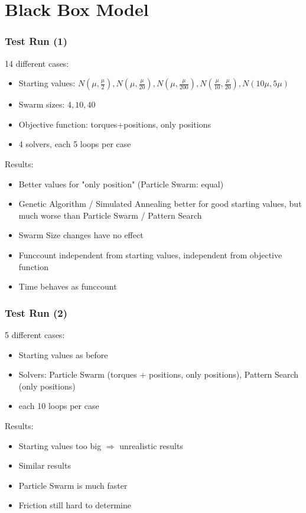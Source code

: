 \documentclass{beamer}
\begin{document}
\section{Black Box Model}
\begin{frame}[c]
	\frametitle{Test Run (1)}
	14 different cases:
	\begin{itemize}
		\item{Starting values: $N(\mu,\frac{\mu} 2), N(\mu,\frac{\mu}{20}), N(\mu,\frac{\mu}{200}), N(\frac{\mu}{10},\frac{\mu}{20}), N(10\mu,5\mu)$}
		\item{Swarm sizes: $4,10,40$}
		\item{Objective function: torques+positions, only positions}
		\item{4 solvers, each 5 loops per case}
	\end{itemize}
	Results:
	\begin{itemize}
		\item{Better values for "only position" (Particle Swarm: equal)}
		\item{Genetic Algorithm / Simulated Annealing better for good starting values, but much worse than Particle Swarm / Pattern Search}
		\item{Swarm Size changes have no effect}
		\item{Funccount independent from starting values, independent from objective function}
		\item{Time behaves as funccount}
	\end{itemize}
\end{frame}

\begin{frame}[c]
	\frametitle{Test Run (2)}
	5 different cases:
	\begin{itemize}
		\item{Starting values as before}
		\item{Solvers: Particle Swarm (torques + positions, only positions), Pattern Search (only positions)}
		\item{each 10 loops per case}
	\end{itemize}
	\vspace{.5cm}
	Results:
	\begin{itemize}
		\item{Starting values too big $\Rightarrow$ unrealistic results}
		\item{Similar results}
		\item{Particle Swarm is much faster}
		\item{Friction still hard to determine}
	\end{itemize}
\end{frame}
\end{document}
